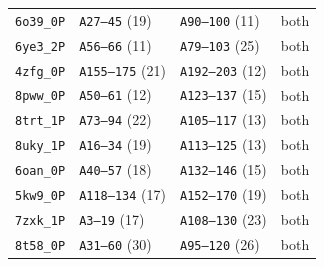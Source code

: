 \begin{longtable}{llll}
\texttt{6o39\_0P} & \texttt{A27--45} (19) & \texttt{A90--100} (11) & both \\
\texttt{6ye3\_2P} & \texttt{A56--66} (11) & \texttt{A79--103} (25) & both \\
\texttt{4zfg\_0P} & \texttt{A155--175} (21) & \texttt{A192--203} (12) & both \\
\texttt{8pww\_0P} & \texttt{A50--61} (12) & \texttt{A123--137} (15) & both \\
\texttt{8trt\_1P} & \texttt{A73--94} (22) & \texttt{A105--117} (13) & both \\
\texttt{8uky\_1P} & \texttt{A16--34} (19) & \texttt{A113--125} (13) & both \\
\texttt{6oan\_0P} & \texttt{A40--57} (18) & \texttt{A132--146} (15) & both \\
\texttt{5kw9\_0P} & \texttt{A118--134} (17) & \texttt{A152--170} (19) & both \\
\texttt{7zxk\_1P} & \texttt{A3--19} (17) & \texttt{A108--130} (23) & both \\
\texttt{8t58\_0P} & \texttt{A31--60} (30) & \texttt{A95--120} (26) & both \\
\end{longtable}
